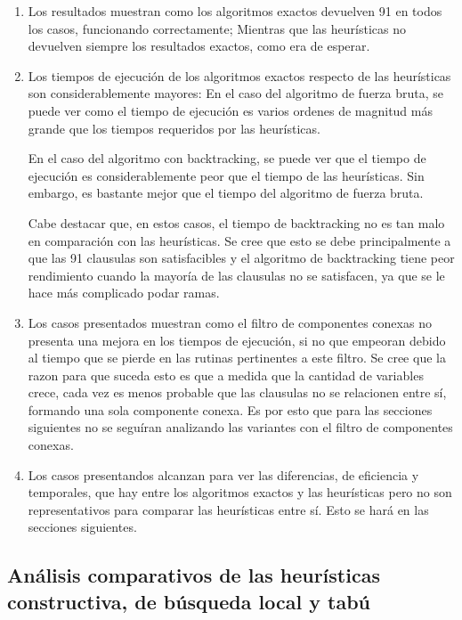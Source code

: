 \documentclass[a4paper,10pt]{article}
\begin{document}
\begin{enumerate}
\item Los resultados muestran como los algoritmos exactos devuelven 91 en todos los casos, funcionando correctamente; Mientras que las heur\'isticas no devuelven siempre los resultados exactos, como era de esperar.
\item Los tiempos de ejecuci\'on de los algoritmos exactos respecto de las heur\'isticas son considerablemente mayores: En el caso del algoritmo de fuerza bruta, se puede ver como el tiempo de ejecuci\'on es varios ordenes de magnitud m\'as grande que los tiempos requeridos por las heur\'isticas.

En el caso del algoritmo con backtracking, se puede ver que el tiempo de ejecuci\'on es considerablemente peor que el tiempo de las heur\'isticas. Sin embargo, es bastante mejor que el tiempo del algoritmo de fuerza bruta.

Cabe destacar que, en estos casos, el tiempo de backtracking no es tan malo en comparaci\'on con las heur\'isticas. Se cree que esto se debe principalmente a que las 91 clausulas son satisfacibles y el algoritmo de backtracking tiene peor rendimiento cuando la mayor\'ia de las clausulas no se satisfacen, ya que se le hace m\'as complicado podar ramas.
\item Los casos presentados muestran como el filtro de componentes conexas no presenta una mejora en los tiempos de ejecuci\'on, si no que empeoran debido al tiempo que se pierde en las rutinas pertinentes a este filtro. Se cree que la razon para que suceda esto es que a medida que la cantidad de variables crece, cada vez es menos probable que las clausulas no se relacionen entre s\'i, formando una sola componente conexa. Es por esto que para las secciones siguientes no se segu\'iran analizando las variantes con el filtro de componentes conexas.
\item Los casos presentandos alcanzan para ver las diferencias, de eficiencia y temporales, que hay entre los algoritmos exactos y las heur\'isticas pero no son representativos para comparar las heur\'isticas entre s\'i. Esto se har\'a en las secciones siguientes.
\end{enumerate}


\subsection*{An\'alisis comparativos de las heur\'isticas constructiva, de b\'usqueda local y tab\'u}
\end{document}
